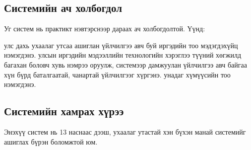 \begin{intro}
\subsection*{Системийн ач холбогдол}
Уг систем нь практикт нэвтэрснээр дараах ач холбогдолтой. Үүнд: 
\begin{itemize}[label={--}]
     улс дахь ухаалаг утсаа ашиглан үйлчилгээ авч буй иргэдийн тоо мэдэгдэхүйц нэмэгдэнэ.
     улсын иргэдийн мэдээллийн технологийн хэрэглээ түүний хөгжилд багахан боловч хувь нэмрээ оруулж, системээр дамжуулан үйлчилгээ авч байгаа хүн бүрд баталгаатай, чанартай үйлчилгээг хүргэнэ.
     унадаг хүмүүсийн тоо нэмэгдэнэ.
\end{itemize}


\subsection*{Системийн хамрах хүрээ}
Энэхүү систем нь 13 наснаас дээш, ухаалаг утастай хэн бүхэн манай системийг ашиглах бүрэн боломжтой юм.

\end{intro}

\clearpage